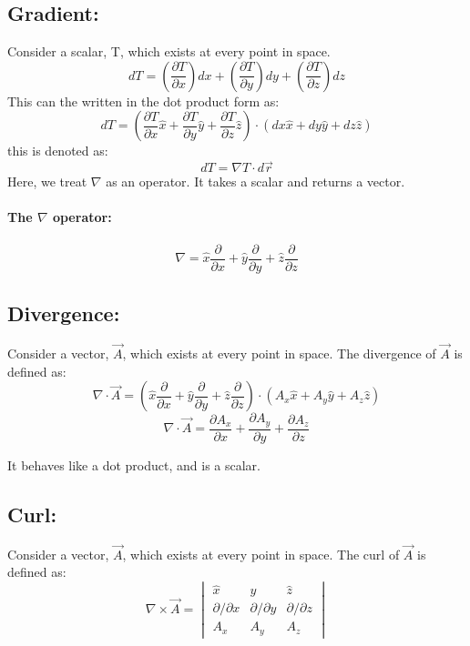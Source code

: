 \documentclass{article}
\begin{document}
\subsection{Gradient:} Consider a scalar, T, which exists at every point in space.
\[d T = \left(\frac{\partial T}{\partial x}\right)dx + \left(\frac{\partial T}{\partial y}\right)dy + \left(\frac{\partial T}{\partial z}\right)dz\]
This can the written in the dot product form as:
\[d T = \left(\frac{\partial T}{\partial x}\hat{x} + \frac{\partial T}{\partial y}\hat{y} + \frac{\partial T}{\partial z}\hat{z} \right) \cdot (dx \hat{x} + dy \hat{y} + dz \hat{z} )\]
this is denoted as:
\[d T = \nabla T \cdot d\vec{r}\]
Here, we treat $\nabla$ as an operator. It takes a scalar and returns a vector.

\paragraph*{The $\nabla$ operator: } \[\nabla = \hat{x} \frac{\partial}{\partial x} + \hat{y} \frac{\partial}{\partial y} + \hat{z} \frac{\partial}{\partial z}\]

\subsection{Divergence: } Consider a vector, $\vec{A}$, which exists at every point in space. The divergence of $\vec{A}$ is defined as:
\[ \nabla \cdot \vec{A} = \left(\hat{x} \frac{\partial}{\partial x} + \hat{y} \frac{\partial}{\partial y} + \hat{z} \frac{\partial}{\partial z}{}\right) \cdot \left(A_x \hat{x} + A_y \hat{y} + A_z \hat{z}\right)\]
\[ \nabla \cdot \vec{A} = \frac{\partial A_x}{\partial x} + \frac{\partial A_y}{\partial y} + \frac{\partial A_z}{\partial z}\]

It behaves like a dot product, and is a scalar.

\subsection{Curl: } Consider a vector, $\vec{A}$, which exists at every point in space. The curl of $\vec{A}$ is defined as:
\[\nabla \times \vec{A}  = \begin{vmatrix}
		\hat{x}             & \hat{y}             & \hat{z}             \\
		\partial/\partial x & \partial/\partial y & \partial/\partial z \\
		A_x                 & A_y                 & A_z
	\end{vmatrix}\]
\end{document}

